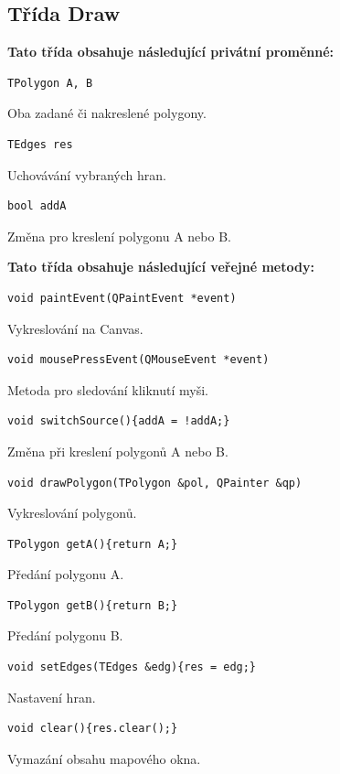 \documentclass[a4paper, 12pt, oneside, titlepage]{article} %
\begin{document}
\subsection{Třída Draw}
\textbf{Tato třída obsahuje následující privátní proměnné:}
\begin{verbatim}
TPolygon A, B
\end{verbatim}
Oba zadané či nakreslené polygony.

\begin{verbatim}
TEdges res
\end{verbatim}
Uchovávání vybraných hran.

\begin{verbatim}
bool addA
\end{verbatim}
Změna pro kreslení polygonu A nebo B.

\textbf{Tato třída obsahuje následující veřejné metody:}
\begin{verbatim}
void paintEvent(QPaintEvent *event)
\end{verbatim} 
Vykreslování na Canvas.   

\begin{verbatim}
void mousePressEvent(QMouseEvent *event)
\end{verbatim} 
Metoda pro sledování kliknutí myši.

\begin{verbatim}
void switchSource(){addA = !addA;}
\end{verbatim} 
Změna při kreslení polygonů A nebo B.

\begin{verbatim}
void drawPolygon(TPolygon &pol, QPainter &qp)
\end{verbatim} 
Vykreslování polygonů.   

\begin{verbatim}
TPolygon getA(){return A;}
\end{verbatim} 
Předání polygonu A.

\begin{verbatim}
TPolygon getB(){return B;}
\end{verbatim} 
Předání polygonu B.

\begin{verbatim}
void setEdges(TEdges &edg){res = edg;}
\end{verbatim} 
Nastavení hran.   

\begin{verbatim}
void clear(){res.clear();}
\end{verbatim} 
Vymazání obsahu mapového okna.
\end{document}
